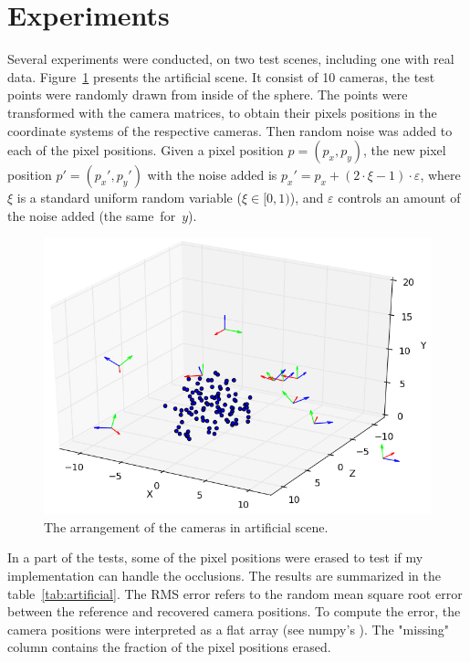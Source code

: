 \documentclass[12pt]{article}
\begin{document}
\section{Experiments}

Several experiments were conducted, on two test scenes, including one with real
data. Figure~\ref{fig:artificial} presents the artificial scene. It consist of
10 cameras, the test points were randomly drawn from inside of the sphere. The
points were transformed with the camera matrices, to obtain their pixels
positions in the coordinate systems of the respective cameras. Then random noise was
added to each of the pixel positions. Given a pixel position $p = (p_x, p_y)$, the
new pixel position $p' = (p_x', p_y')$ with the noise added is $p_x' = p_x + (2
\cdot \xi - 1) \cdot \varepsilon$, where $\xi$ is a standard uniform random
variable ($\xi \in [0, 1)$), and $\varepsilon$ controls an amount of the noise added (the
same~for~$y$).

\begin{figure}[!ht]
\centering
\includegraphics[scale=0.5]{artificial.png}
\caption{The arrangement of the cameras in artificial scene.}
\label{fig:artificial}
\end{figure}

In a part of the tests, some of the pixel positions were erased to test if my
implementation can handle the occlusions. The results are summarized in the
table~\ref{tab:artificial}. The RMS error refers to the random mean square root
error between the reference and recovered camera positions. To compute the error, the camera positions were interpreted as a flat array (see numpy's ). The "missing" column
contains the fraction of the pixel positions erased.
\end{document}
